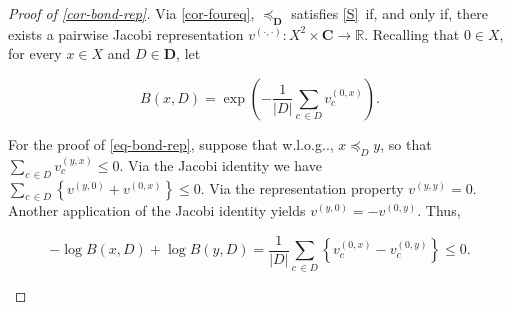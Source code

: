 \documentclass[ecta,nameyear,draft]{econsocart}
\makeatletter
\newcommand{\R}{\mathbb R}
\newcommand{\mbbd}{{\mathbf D}}
\newcommand{\mbbc}{{\mathbf C}}
\newcommand{\xy}{{(x, y)}}
\newcommand{\yx}{{(y, x)}}
\newcommand{\dd}{{(\cdot,\cdot)}}
\newcommand{\stability}{\ref{S}}
\newcommand\withoutlog{w\@.l\@.o\@.g\@ifnextchar.{}{.\@}}
\theoremstyle{plain}
\theoremstyle{remark}
\makeatother
\begin{document}
\begin{proof}[Proof of \cref{cor-bond-rep}] Via \cref{cor-foureq},
  $\preceq_{\mbbd}$ satisfies \stability\ if, and only if, there exists a
  pairwise Jacobi representation $v^{\dd}: X^{2} \times \mbbc \rightarrow \R$.
  Recalling that $0 \in X$, for every $x\in X$ and $D \in \mbbd$, let
  \begin{linenomath*}
    \begin{equation}\label{eq-bond-vxy} \textstyle B(x,D) = \exp\left(
        -\frac{1}{\lvert D \rvert} \sum_{c\,\in D}
      v^{(0, x)}_{c} \right).
    \end{equation}
  \end{linenomath*}
  For the proof of \eqref{eq-bond-rep}, suppose that \withoutlog, $x
  \preceq_{D} y$, so that $\sum_{c\,\in D} v^{\yx}_{c} \leq 0$. Via the Jacobi
  identity we have $ \sum_{c\,\in D} \left\{v^{(y,0)} + v^{(0,x)} \right\} \leq
  0$.  Via the representation property $v^{(y, y)} = 0$.  Another application
  of the Jacobi identity yields $v^{(y, 0)} = -v^{(0, y)}$. Thus, 
  \begin{linenomath*}
    \begin{equation*}
      \textstyle - \log B(x,D) + \log B(y,D) = \frac{1}{\lvert D\rvert}
      \sum_{c\,\in D} \left \{v^{(0, x)}_{c} - v^{(0, y)}_{c}\right \} \leq 0.
    \end{equation*}
  \end{linenomath*}


\end{proof}
\end{document}
